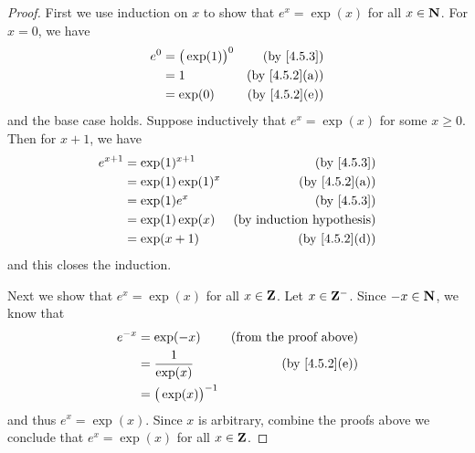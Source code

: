 \begin{proof}
  First we use induction on \(x\) to show that \(e^x = \exp(x)\) for all \(x \in \mathbf{N}\).
  For \(x = 0\), we have
  \begin{align*}
    e^0 & = \big(\exp(1)\big)^0 & \text{(by \cref{4.5.3})}    \\
        & = 1                   & \text{(by \cref{4.5.2}(a))} \\
        & = \exp(0)             & \text{(by \cref{4.5.2}(e))}
  \end{align*}
  and the base case holds.
  Suppose inductively that \(e^x = \exp(x)\) for some \(x \geq 0\).
  Then for \(x + 1\), we have
  \begin{align*}
    e^{x + 1} & = \exp(1)^{x + 1}   & \text{(by \cref{4.5.3})}         \\
              & = \exp(1) \exp(1)^x & \text{(by \cref{4.5.2}(a))}      \\
              & = \exp(1) e^x       & \text{(by \cref{4.5.3})}         \\
              & = \exp(1) \exp(x)   & \text{(by induction hypothesis)} \\
              & = \exp(x + 1)       & \text{(by \cref{4.5.2}(d))}
  \end{align*}
  and this closes the induction.

  Next we show that \(e^x = \exp(x)\) for all \(x \in \mathbf{Z}\).
  Let \(x \in \mathbf{Z}^-\).
  Since \(-x \in \mathbf{N}\), we know that
  \begin{align*}
    e^{-x} & = \exp(-x)               & \text{(from the proof above)} \\
           & = \frac{1}{\exp(x)}      & \text{(by \cref{4.5.2}(e))}   \\
           & = \big(\exp(x)\big)^{-1}
  \end{align*}
  and thus \(e^x = \exp(x)\).
  Since \(x\) is arbitrary, combine the proofs above we conclude that \(e^x = \exp(x)\) for all \(x \in \mathbf{Z}\).


\end{proof}
